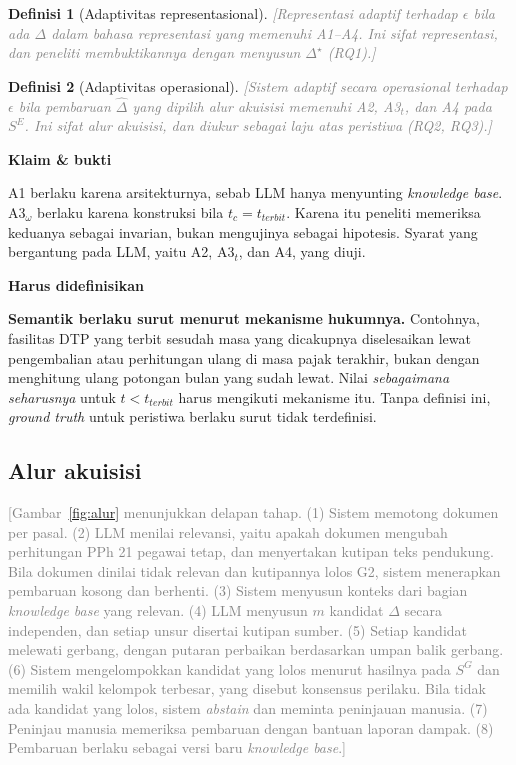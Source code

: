 \documentclass[journal,a4paper]{IEEEtran}
\newcommand{\en}[1]{\textit{#1}}
\newtheorem{definisi}{Definisi}
\newcommand{\emas}{\star}
\newcommand{\SG}{S^{G}}
\newcommand{\SE}{S^{E}}
\newif\ifrancangan \rancangantrue
\newcommand{\kotak}[3]{\ifrancangan\par\begingroup\scriptsize
  \def\FrameCommand{\fboxsep=3pt\fboxrule=0.4pt\fcolorbox{#1!60!black}{#1!6}}%
  \MakeFramed{\advance\hsize-\width\FrameRestore}\noindent\textbf{#2}\par #3\endMakeFramed\endgroup\fi}
\newcommand{\definisikan}[1]{\kotak{teal}{Harus didefinisikan}{#1}}
\newcommand{\klaim}[1]{\kotak{green}{Klaim \& bukti}{#1}}
\newcommand{\isian}[1]{\ifrancangan\textcolor{gray}{[#1]}\fi}
\begin{document}
\begin{definisi}[Adaptivitas representasional]
\label{def:adapt-rep}
\isian{Representasi adaptif terhadap $\epsilon$ bila \emph{ada} $\Delta$ dalam bahasa representasi yang memenuhi A1--A4. Ini sifat representasi, dan peneliti membuktikannya dengan menyusun $\Delta^{\emas}$ (RQ1).}
\end{definisi}

\begin{definisi}[Adaptivitas operasional]
\label{def:adapt-op}
\isian{Sistem adaptif secara operasional terhadap $\epsilon$ bila pembaruan $\hat{\Delta}$ yang \emph{dipilih alur akuisisi} memenuhi A2, A3$_t$, dan A4 pada $\SE$. Ini sifat alur akuisisi, dan diukur sebagai laju atas peristiwa (RQ2, RQ3).}
\end{definisi}

\klaim{A1 berlaku karena arsitekturnya, sebab LLM hanya menyunting \en{knowledge base}. A3$_\omega$ berlaku karena konstruksi bila $t_c = t_{\mathit{terbit}}$. Karena itu peneliti memeriksa keduanya sebagai invarian, bukan mengujinya sebagai hipotesis. Syarat yang bergantung pada LLM, yaitu A2, A3$_t$, dan A4, yang diuji.}

\definisikan{\textbf{Semantik berlaku surut menurut mekanisme hukumnya.} Contohnya, fasilitas DTP yang terbit sesudah masa yang dicakupnya diselesaikan lewat pengembalian atau perhitungan ulang di masa pajak terakhir, bukan dengan menghitung ulang potongan bulan yang sudah lewat. Nilai \emph{sebagaimana seharusnya} untuk $t < t_{\mathit{terbit}}$ harus mengikuti mekanisme itu. Tanpa definisi ini, \en{ground truth} untuk peristiwa berlaku surut tidak terdefinisi.}

\subsection{Alur akuisisi}
\isian{Gambar~\ref{fig:alur} menunjukkan delapan tahap. (1) Sistem memotong dokumen per pasal. (2) LLM menilai relevansi, yaitu apakah dokumen mengubah perhitungan PPh 21 pegawai tetap, dan menyertakan kutipan teks pendukung. Bila dokumen dinilai tidak relevan dan kutipannya lolos G2, sistem menerapkan pembaruan kosong dan berhenti. (3) Sistem menyusun konteks dari bagian \en{knowledge base} yang relevan. (4) LLM menyusun $m$ kandidat $\Delta$ secara independen, dan setiap unsur disertai kutipan sumber. (5) Setiap kandidat melewati gerbang, dengan putaran perbaikan berdasarkan umpan balik gerbang. (6) Sistem mengelompokkan kandidat yang lolos menurut hasilnya pada $\SG$ dan memilih wakil kelompok terbesar, yang disebut konsensus perilaku. Bila tidak ada kandidat yang lolos, sistem \en{abstain} dan meminta peninjauan manusia. (7) Peninjau manusia memeriksa pembaruan dengan bantuan laporan dampak. (8) Pembaruan berlaku sebagai versi baru \en{knowledge base}.}
\end{document}

